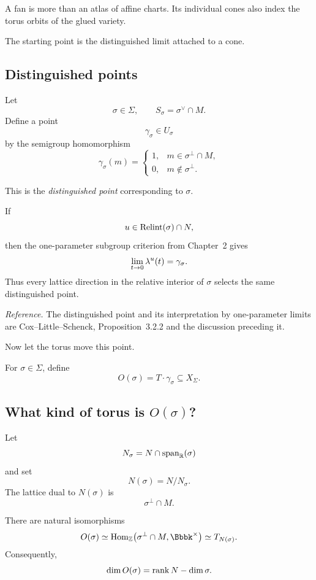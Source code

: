 A fan is more than an atlas of affine charts. Its individual cones
also index the torus orbits of the glued variety.

The starting point is the distinguished limit attached to a cone.

\subsection{Distinguished points}

Let
\[
\sigma\in\Sigma,
\qquad
S_\sigma=\sigma^\vee\cap M.
\]
Define a point
\[
\gamma_\sigma\in U_\sigma
\]
by the semigroup homomorphism
\[
\gamma_\sigma(m)
=
\begin{cases}
1,&m\in\sigma^\perp\cap M,\\
0,&m\notin\sigma^\perp.
\end{cases}
\]

This is the \emph{distinguished point} corresponding to \(\sigma\).

If
\[
u\in\operatorname{Relint}(\sigma)\cap N,
\]
then the one-parameter subgroup criterion from Chapter~2 gives
\[
\lim_{t\to0}\lambda^{u}(t)=\gamma_\sigma.
\]
Thus every lattice direction in the relative interior of \(\sigma\)
selects the same distinguished point.

\noindent
\textit{Reference.}
The distinguished point and its interpretation by one-parameter
limits are Cox--Little--Schenck, Proposition~3.2.2 and the discussion
preceding it.

Now let the torus move this point.

\begin{definition}
For \(\sigma\in\Sigma\), define
\[
O(\sigma)
=
T\cdot\gamma_\sigma
\subseteq X_\Sigma.
\]
\end{definition}

\subsection{What kind of torus is \texorpdfstring{\(O(\sigma)\)}{O(sigma)}?}

Let
\[
N_\sigma
=
N\cap\operatorname{span}_{\mathbb{R}}(\sigma)
\]
and set
\[
N(\sigma)=N/N_\sigma.
\]
The lattice dual to \(N(\sigma)\) is
\[
\sigma^\perp\cap M.
\]

\begin{proposition}
\label{prop:orbit-attached-to-cone}
There are natural isomorphisms
\[
O(\sigma)
\simeq
\Hom_{\ZZ}
\bigl(\sigma^\perp\cap M,\Bbbk^\times\bigr)
\simeq
T_{N(\sigma)}.
\]
Consequently,
\[
\dim O(\sigma)
=
\operatorname{rank} N-\dim\sigma.
\]
\end{proposition}


